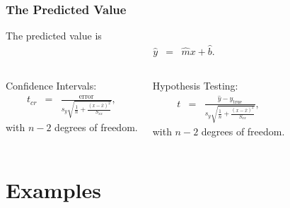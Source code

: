 \begin{frame}
  \frametitle{The Predicted Value}

  The predicted value is 
  \begin{eqnarray*}
    \hat{y} & = & \hat{m} x + \hat{b}.
  \end{eqnarray*}



    \begin{columns}

      Confidence Intervals:
      \begin{eqnarray*}
        t_{cr} & = & \frac{\mathrm{error}}{s_y \sqrt{\frac{1}{n}+\frac{(x-\bar{x})^2}{S_{xx}}}},
      \end{eqnarray*}
      with $n-2$ degrees of freedom.


      Hypothesis Testing:
      \begin{eqnarray*}
        t & = & \frac{\hat{y}-y_{\mathrm{true}}}{s_y \sqrt{\frac{1}{n}+\frac{(x-\bar{x})^2}{S_{xx}}}},
      \end{eqnarray*}
      with $n-2$ degrees of freedom.

    
    \end{columns}


\end{frame}


\section{Examples}


